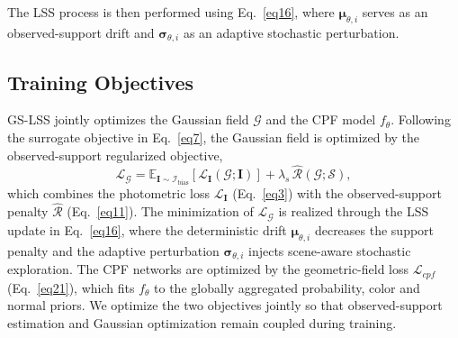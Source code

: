 \documentclass[lettersize,journal]{IEEEtran}
\begin{document}
The LSS process is then performed using Eq.~\ref{eq16}, where $\boldsymbol{\mu}_{\theta,i}$ serves as an observed-support drift and $\boldsymbol{\sigma}_{\theta,i}$ as an adaptive stochastic perturbation.  

\subsection{Training Objectives}

GS-LSS jointly optimizes the Gaussian field $\mathcal{G}$ and the CPF model $f_{\theta}$. Following the surrogate objective in Eq.~\ref{eq7}, the Gaussian field is optimized by the observed-support regularized objective,
\begin{equation}
    \mathcal{L}_{\mathcal{G}} = \mathbb{E}_{\mathbf{I} \sim \mathcal{I}_{\text{bias}}} \left[ \mathcal{L}_{\mathbf{I}}(\mathcal{G};\mathbf{I}) \right] + \lambda_{s} \, \widehat{\mathcal{R}}(\mathcal{G};\mathcal{S}),
    \label{eq26}
\end{equation}
which combines the photometric loss $\mathcal{L}_{\mathbf{I}}$ (Eq.~\ref{eq3}) with the observed-support penalty $\widehat{\mathcal{R}}$ (Eq.~\ref{eq11}). The minimization of $\mathcal{L}_{\mathcal{G}}$ is realized through the LSS update in Eq.~\ref{eq16}, where the deterministic drift $\boldsymbol{\mu}_{\theta,i}$ decreases the support penalty and the adaptive perturbation $\boldsymbol{\sigma}_{\theta,i}$ injects scene-aware stochastic exploration. The CPF networks are optimized by the geometric-field loss $\mathcal{L}_{cpf}$ (Eq.~\ref{eq21}), which fits $f_{\theta}$ to the globally aggregated probability, color and normal priors. 
We optimize the two objectives jointly so that observed-support estimation and Gaussian optimization remain coupled during training.
    

\end{document}

